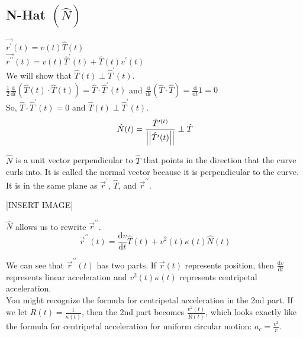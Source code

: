 \subsection{N-Hat $\left(\hat{N}\right)$}
\noindent
$\vec{r^{\prime}}(t) = v(t)\hat{T}(t)$\\
$\vec{r^{\prime\prime}}(t) = v(t)\hat{T}^{\prime}(t)+\hat{T}(t)v^{\prime}(t)$\\

\noindent
We will show that $\hat{T}(t) \perp \hat{T}^{\prime}(t)$.\\
\indent
$\frac{1}{2}\frac{\mathrm{d}}{\mathrm{d}t}\left(\hat{T}(t)\cdot\hat{T}(t)\right) = \hat{T}\cdot\hat{T}^{\prime}(t)$ and $\frac{\mathrm{d}}{\mathrm{d}t}\left(\hat{T}\cdot\hat{T}\right) = \frac{\mathrm{d}}{\mathrm{d}t}1 = 0$\\
\indent
So, $\hat{T}\cdot\hat{T}^{\prime}(t) = 0$ and $\hat{T}(t)\perp\hat{T}^{\prime}(t)$.\\
\noindent
\begin{equation*}
	\hat{N}(t)=\frac{\hat{T}^{\prime(t)}}{\left|\left|\hat{T}^{\prime}(t)\right|\right|}\perp\hat{T}
\end{equation*}

\noindent
$\hat{N}$ is a unit vector perpendicular to $\hat{T}$ that points in the direction that the curve curls into. It is called the normal vector because it is perpendicular to the curve. It is in the same plane as $\vec{r}^\prime$, $\hat{T}$, and  $\vec{r}^{\prime\prime}$.

[INSERT IMAGE]

\noindent
$\hat{N}$ allows us to rewrite $\vec{r}^{\prime\prime}$.\\
\begin{equation*}
	\vec{r}^{\prime\prime}(t)=\frac{\mathrm{d}v}{\mathrm{d}t}\hat{T}(t)+v^{2}(t)\kappa(t)\hat{N}(t)
\end{equation*}

\noindent
We can see that $\vec{r}^{\prime\prime}(t)$ has two parts. If $\vec{r}(t)$ represents position, then $\frac{\mathrm{d}v}{\mathrm{d}t}$ represents linear acceleration and $v^2(t)\kappa(t)$ represents centripetal acceleration.\\ 
You might recognize the formula for centripetal acceleration in the 2nd part. If we let $R(t) = \frac{1}{\kappa(t)}$, then the 2nd part becomes $\frac{v^2(t)}{R(t)}$, which looks exactly like the formula for centripetal acceleration for uniform circular motion: $a_c = \frac{v^2}{r}$.